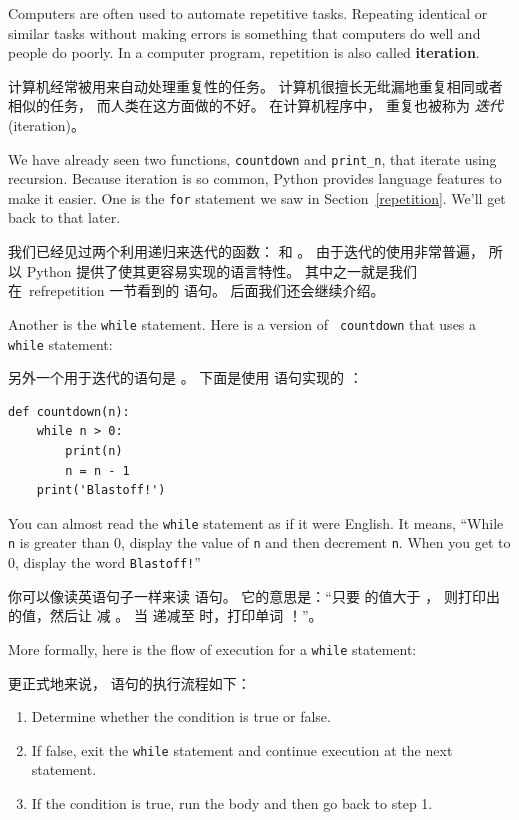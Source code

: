 Computers are often used to automate repetitive tasks.  Repeating
identical or similar tasks without making errors is something that
computers do well and people do poorly.  In a computer program,
repetition is also called {\bf iteration}.

计算机经常被用来自动处理重复性的任务。 计算机很擅长无纰漏地重复相同或者相似的任务， 而人类在这方面做的不好。 在计算机程序中， 重复也被称为 {\em 迭代} (iteration)。

We have already seen two functions, {\tt countdown} and
\verb"print_n", that iterate using recursion.  Because iteration is so
common, Python provides language features to make it easier.
One is the {\tt for} statement we saw in Section~\ref{repetition}.
We'll get back to that later.

我们已经见过两个利用递归来迭代的函数：  和  。 由于迭代的使用非常普遍， 所以 Python 提供了使其更容易实现的语言特性。 其中之一就是我们在~\:ref{repetition} 一节看到的  语句。 后面我们还会继续介绍。


Another is the {\tt while} statement.  Here is a version of {\tt
countdown} that uses a {\tt while} statement:

另外一个用于迭代的语句是  。 下面是使用  语句实现的 ：

\begin{lstlisting}
def countdown(n):
    while n > 0:
        print(n)
        n = n - 1
    print('Blastoff!')
\end{lstlisting}

%
You can almost read the {\tt while} statement as if it were English.
It means, ``While {\tt n} is greater than 0,
display the value of {\tt n} and then decrement
{\tt n}.  When you get to 0, display the word {\tt Blastoff!}''

你可以像读英语句子一样来读  语句。 它的意思是：``只要  的值大于 ， 则打印出  的值，然后让  减 。 当  递减至  时，打印单词 ！''。

More formally, here is the flow of execution for a {\tt while} statement:

更正式地来说， 语句的执行流程如下：

\begin{enumerate}

\item Determine whether the condition is true or false.

\item If false, exit the {\tt while} statement
and continue execution at the next statement.

\item If the condition is true, run the
body and then go back to step 1.

\end{enumerate}

